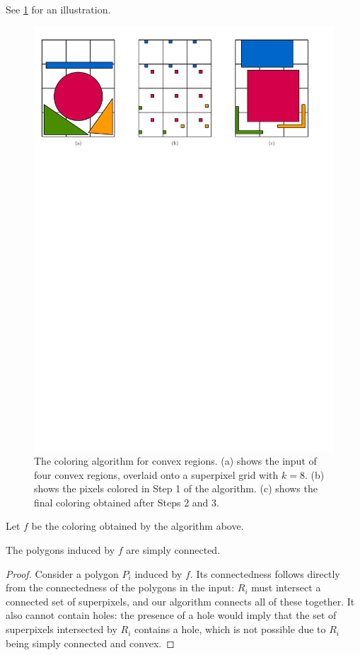 \documentclass[a4paper,UKenglish,cleveref]{lipics-v2019}
\begin{document}
\noindent
See \cref{fig:convexprojection} for an illustration.

\begin{figure}
\centering
\includegraphics[width=\textwidth]{Figures/convexprojection.pdf}
\caption{The coloring algorithm for convex regions. (a) shows the input of four convex regions, overlaid onto a superpixel grid with \(k = 8\). (b) shows the pixels colored in Step 1 of the algorithm. (c) shows the final coloring obtained after Steps 2 and 3.}
\label{fig:convexprojection}
\end{figure}

Let \(f\) be the coloring obtained by the algorithm above.

\begin{lemma}\label{lem:convex-simply-connected}
	The polygons induced by \(f\) are simply connected.
\end{lemma}
\begin{proof}
	Consider a polygon \(P_i\) induced by \(f\). Its connectedness follows directly from the connectedness of the polygons in the input: \(R_i\) must intersect a connected set of superpixels, and our algorithm connects all of these together. It also cannot contain holes: the presence of a hole would imply that the set of superpixels intersected by \(R_i\) contains a hole, which is not possible due to \(R_i\) being simply connected and convex.
\end{proof}
\end{document}
